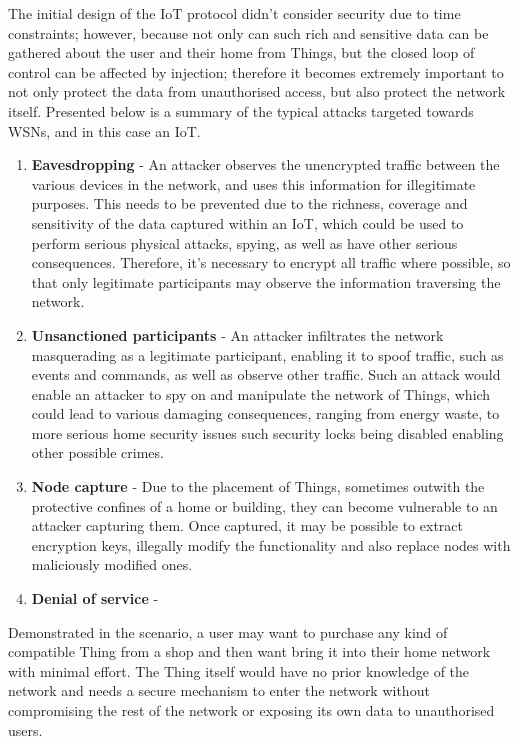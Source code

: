 \documentclass{mprop}
\begin{document}
The initial design of the IoT protocol didn't consider security due to time constraints; however, because not only can such rich and sensitive data can be gathered about the user and their home from Things, but the closed loop of control can be affected by injection; therefore it becomes extremely important to not only protect the data from unauthorised access, but also protect the network itself. 
Presented below is a summary of the typical attacks targeted towards WSNs, and in this case an IoT.
\begin{enumerate}
  \item \textbf{Eavesdropping} - An attacker observes the unencrypted traffic between the various devices in the network, and uses this information for illegitimate purposes. This needs to be prevented due to the richness, coverage and sensitivity of the data captured within an IoT, which could be used to perform serious physical attacks, spying, as well as have other serious consequences. Therefore, it's necessary to encrypt all traffic where possible, so that only legitimate participants may observe the information traversing the network.
  \item \textbf{Unsanctioned participants} - An attacker infiltrates the network masquerading as a legitimate participant, enabling it to spoof traffic, such as events and commands, as well as observe other traffic. Such an attack would enable an attacker to spy on and manipulate the network of Things, which could lead to various damaging consequences, ranging from energy waste, to more serious home security issues such security locks being disabled enabling other possible crimes.
  \item \textbf{Node capture} - Due to the placement of Things, sometimes outwith the protective confines of a home or building, they can become vulnerable to an attacker capturing them. Once captured, it may be possible to extract encryption keys, illegally modify the functionality and also replace nodes with maliciously modified ones.
  \item \textbf{Denial of service} - 
\end{enumerate}

Demonstrated in the scenario, a user may want to purchase any kind of compatible Thing from a shop and then want bring it into their home network with minimal effort. The Thing itself would have no prior knowledge of the network and needs a secure mechanism to enter the network without compromising the rest of the network or exposing its own data to unauthorised users. 
\end{document}
